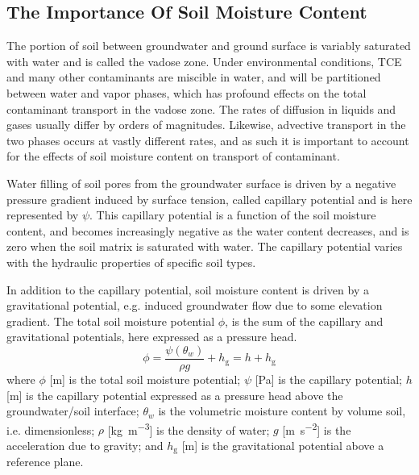 \subsection{The Importance Of Soil Moisture Content}\label{sec:van_genuchten}

The portion of soil between groundwater and ground surface is variably saturated with water and is called the vadose zone.
Under environmental conditions, TCE and many other contaminants are miscible in water, and will be partitioned between water and vapor phases, which has profound effects on the total contaminant transport in the vadose zone.
The rates of diffusion in liquids and gases usually differ by orders of magnitudes.
Likewise, advective transport in the two phases occurs at vastly different rates, and as such it is important to account for the effects of soil moisture content on transport of contaminant.\par

Water filling of soil pores from the groundwater surface is driven by a negative pressure gradient induced by surface tension, called capillary potential and is here represented by $\psi$.
This capillary potential is a function of the soil moisture content, and becomes increasingly negative as the water content decreases, and is zero when the soil matrix is saturated with water.
The capillary potential varies with the hydraulic properties of specific soil types.\par

In addition to the capillary potential, soil moisture content is driven by a gravitational potential, e.g. induced groundwater flow due to some elevation gradient.
The total soil moisture potential $\phi$, is the sum of the capillary and gravitational potentials, here expressed as a pressure head.
\begin{equation}
  \phi = \frac{\psi(\theta_w)}{\rho g} + h_\mathrm{g} = h + h_\mathrm{g}
\end{equation}
where $\phi$ [\si{\metre}] is the total soil moisture potential;
$\psi$ [\si{\pascal}] is the capillary potential;
$h$ [\si{\metre}] is the capillary potential expressed as a pressure head above the groundwater/soil interface;
$\theta_w$ is the volumetric moisture content by volume soil, i.e. dimensionless;
$\rho$ [\si{\kilo\gram\per\metre\cubed}] is the density of water;
$g$ [\si{\metre\per\second\squared}] is the acceleration due to gravity;
and $h_\mathrm{g}$ [\si{\metre}] is the gravitational potential above a reference plane.\par

